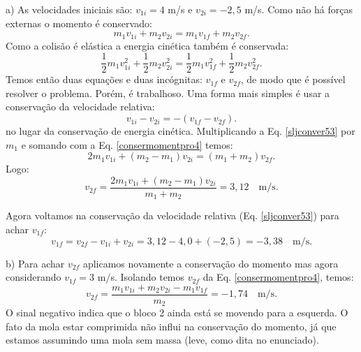 \documentclass[12pt]{article}
\newenvironment{problem}[2][{\color{red}Problema}]{\begin{trivlist}
\item[\hskip \labelsep {\bfseries #1}\hskip \labelsep {\bfseries #2.}]}{\end{trivlist}}
\begin{document}
\begin{problem}{4} 
a) As velocidades iniciais são: $v_{1i}=4$ m/s e $v_{2i}=-2,5$ m/s. Como não há forças externas o momento é conservado:
\begin{equation}
m_1 v_{1i} + m_2 v_{2i} = m_1 v_{1f} + m_2 v_{2f}. \label{consermomentpro4}
\end{equation}
Como a colisão é elástica a energia cinética também é conservada:
\begin{equation}
\frac{1}{2} m_1 v_{1i}^2 + \frac{1}{2} m_2 v_{2i}^2 = \frac{1}{2} m_1 v_{1f}^2 + \frac{1}{2} m_2 v_{2f}^2. \nonumber
\end{equation}
Temos então duas equações e duas incógnitas: $v_{1f}$ e $v_{2f}$, de modo que é possível resolver o problema. Porém, é trabalhoso. Uma forma mais simples é usar a conservação da velocidade relativa:
\begin{equation}
v_{1i} -v_{2i} =  -(v_{1f} - v_{2f}). \label{sljconver53}
\end{equation}
no lugar da conservação de energia cinética. Multiplicando a Eq. \ref{sljconver53} por $m_1$ e somando com a Eq. \ref{consermomentpro4} temos:
\begin{equation}
2m_1 v_{1i} + (m_2-m_1)v_{2i} = (m_1+m_2)v_{2f}. \nonumber
\end{equation}
Logo:
{\color{red}
\begin{equation}
v_{2f} = \dfrac{2m_1 v_{1i} + (m_2-m_1)v_{2i}}{m_1+m_2} = 3,12 \quad \text{m/s}. \nonumber
\end{equation}}

Agora voltamos na conservação da velocidade relativa (Eq. \ref{sljconver53}) para achar $v_{1f}$:
{\color{red}
\begin{equation}
v_{1f} = v_{2f} - v_{1i} + v_{2i} = 3,12 - 4,0 + (-2,5) = -3,38 \quad \text{m/s}. \nonumber
\end{equation}}

\noindent
b) Para achar $v_{2f}$ aplicamos novamente a conservação do momento mas agora considerando $v_{1f}=3$ m/s. Isolando temos $v_{2f}$ da Eq. \ref{consermomentpro4}, temos:
{\color{red}
\begin{equation} 
v_{2f} = \dfrac{m_1 v_{1i} + m_2 v_{2i} - m_1 v_{1f}}{m_2}=-1,74 \quad \text{m/s}. \nonumber
\end{equation}}
O sinal negativo indica que o bloco 2 ainda está se movendo para a esquerda. O fato da mola estar comprimida não influi na conservação do momento, já que estamos assumindo uma mola sem massa (leve, como dita no enunciado).


\end{problem}
\end{document}

